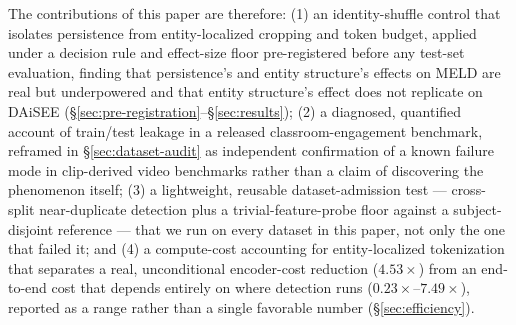 The contributions of this paper are therefore: (1) an identity-shuffle
control that isolates persistence from entity-localized cropping and token
budget, applied under a decision rule and effect-size floor pre-registered
before any test-set evaluation, finding that persistence's and entity
structure's effects on MELD are real but underpowered and that entity
structure's effect does not replicate on DAiSEE
(\S\ref{sec:pre-registration}--\S\ref{sec:results}); (2) a diagnosed,
quantified account of train/test leakage in a released classroom-engagement
benchmark, reframed in \S\ref{sec:dataset-audit} as independent confirmation
of a known failure mode in clip-derived video benchmarks rather than a claim
of discovering the phenomenon itself; (3) a lightweight, reusable
dataset-admission test --- cross-split near-duplicate detection plus a
trivial-feature-probe floor against a subject-disjoint reference --- that we
run on every dataset in this paper, not only the one that failed it; and (4)
a compute-cost accounting for entity-localized tokenization that separates a
real, unconditional encoder-cost reduction ($4.53\times$) from an end-to-end
cost that depends entirely on where detection runs
($0.23\times$--$7.49\times$), reported as a range rather than a single
favorable number (\S\ref{sec:efficiency}).

